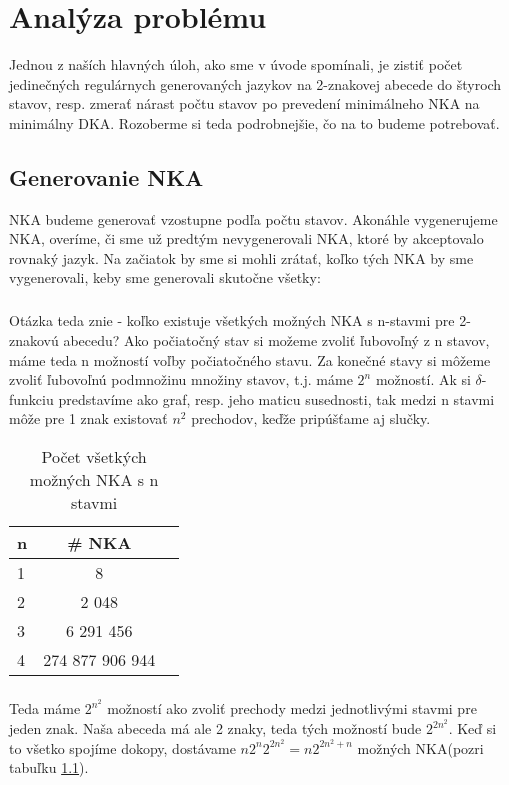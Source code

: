 \chapter{Analýza problému}
Jednou z naších hlavných úloh, ako sme v úvode spomínali, je zistiť počet jedinečných regulárnych generovaných jazykov na 2-znakovej abecede do štyroch stavov, resp. zmerať nárast počtu stavov po prevedení minimálneho NKA na minimálny DKA. Rozoberme si teda podrobnejšie, čo na to budeme potrebovať.  

\section{Generovanie NKA}
NKA budeme generovať vzostupne podľa počtu stavov. Akonáhle vygenerujeme NKA, overíme, či sme už predtým nevygenerovali NKA, ktoré by akceptovalo rovnaký jazyk. Na začiatok by sme si mohli zrátať, koľko tých NKA by sme vygenerovali, keby sme generovali skutočne všetky:
\paragraph{}
Otázka teda znie - koľko existuje všetkých možných NKA s n-stavmi pre 2-znakovú abecedu? Ako počiatočný stav si možeme zvoliť ľubovoľný z n stavov, máme teda n možností voľby počiatočného stavu. Za konečné stavy si môžeme zvoliť ľubovoľnú podmnožinu množiny stavov, t.j. máme $2^n$ možností. Ak si $\delta$-funkciu predstavíme ako graf, resp. jeho maticu susednosti, tak medzi n stavmi môže pre 1 znak existovať $n^2$ prechodov, keďže pripúšťame aj slučky. 


\begin{table}[h]
  \centering
  \begin{tabular}{|l|c|r|}
    \hline
    n & \# NKA \\
    \hline
    1 & 8 \\ 
    \hline
    2 & 2 048 \\ 
    \hline
    3 & 6 291 456 \\
    \hline
    4 & 274 877 906 944 \\
    \hline
  \end{tabular}
  \caption{Počet všetkých možných NKA s n stavmi}
  \label{tab:pocVsNKA}
\end{table}
\paragraph{}


Teda máme $2^{n^2}$ možností ako zvoliť prechody medzi jednotlivými stavmi pre jeden znak. Naša abeceda má ale 2 znaky, teda tých možností bude $2^{2n^2}$. Keď si to všetko spojíme dokopy, dostávame $n2^n2^{2n^2} = n2^{2n^2 + n}$ možných NKA(pozri tabuľku \ref{tab:pocVsNKA}).
